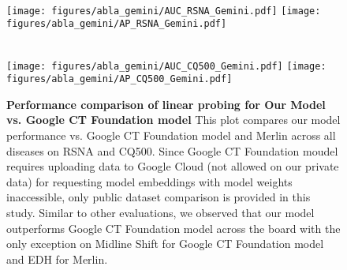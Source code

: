 \begin{figure}
\centering
{} \\[0.2cm]
\texttt{[image: figures/abla\_gemini/AUC\_RSNA\_Gemini.pdf]}
\texttt{[image: figures/abla\_gemini/AP\_RSNA\_Gemini.pdf]}

 \\[0.2cm]
\texttt{[image: figures/abla\_gemini/AUC\_CQ500\_Gemini.pdf]}
\texttt{[image: figures/abla\_gemini/AP\_CQ500\_Gemini.pdf]}

\caption{\textbf{Performance comparison of linear probing for Our Model vs. Google CT Foundation model} This plot compares our model performance vs. Google CT Foundation model\cite{yang2024advancing} and Merlin \cite{blankemeier2024merlinvisionlanguagefoundation} across all diseases on RSNA and CQ500. Since Google CT Foundation moudel requires uploading data to Google Cloud (not allowed on our private data) for requesting model embeddings with model weights inaccessible, only public dataset comparison is provided in this study. Similar to other evaluations, we observed that our model outperforms Google CT Foundation model across the board with the only exception on Midline Shift for Google CT Foundation model and EDH for Merlin.}
\label{fig:probing-comparison-gemini}
\end{figure}
